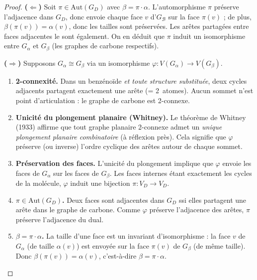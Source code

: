 \documentclass[12pt,a4paper]{article}
\theoremstyle{definition}
\theoremstyle{remark}
\newcommand{\B}{\mathcal{B}}
\newcommand{\GD}{G_{\!D}}
\newcommand{\GB}{G_{\!\B}}
\newcommand{\VD}{V_{\!D}}
\newcommand{\Aut}{\mathrm{Aut}}
\begin{document}
\begin{proof}
\textbf{(}$\Leftarrow$\textbf{)} Soit $\pi \in \Aut(\GD)$ avec
$\beta = \pi \cdot \alpha$. L'automorphisme $\pi$ pr\'eserve l'adjacence
dans $\GD$, donc envoie chaque face $v$ d'$\GB$ sur la face $\pi(v)$ ;
de plus, $\beta(\pi(v)) = \alpha(v)$, donc les tailles sont pr\'eserv\'ees.
Les ar\^etes partag\'ees entre faces adjacentes le sont \'egalement.
On en d\'eduit que $\pi$ induit un isomorphisme entre $G_\alpha$ et
$G_\beta$ (les graphes de carbone respectifs).

\textbf{(}$\Rightarrow$\textbf{)} Supposons $G_\alpha \cong G_\beta$
via un isomorphisme $\varphi : V(G_\alpha) \to V(G_\beta)$.

\begin{enumerate}[label=(\arabic*),leftmargin=*]
  \item \textbf{2-connexit\'e.}
        Dans un benz\'eno\"ide \emph{et toute structure substitu\'ee},
        deux cycles adjacents partagent exactement une ar\^ete
        (= 2~atomes). Aucun sommet n'est point d'articulation : le
        graphe de carbone est 2-connexe.
  \item \textbf{Unicit\'e du plongement planaire (Whitney).}
        Le th\'eor\`eme de Whitney (1933) affirme que tout graphe
        planaire 2-connexe admet un \emph{unique plongement planaire
        combinatoire} (\`a r\'eflexion pr\`es). Cela signifie que
        $\varphi$ pr\'eserve (ou inverse) l'ordre cyclique des ar\^etes
        autour de chaque sommet.
  \item \textbf{Pr\'eservation des faces.}
        L'unicit\'e du plongement implique que $\varphi$ envoie les
        faces de $G_\alpha$ sur les faces de $G_\beta$. Les faces
        internes \'etant exactement les cycles de la mol\'ecule, $\varphi$
        induit une bijection $\pi : \VD \to \VD$.
  \item \textbf{$\pi \in \Aut(\GD)$.}
        Deux faces sont adjacentes dans $\GD$ ssi elles partagent une
        ar\^ete dans le graphe de carbone. Comme $\varphi$ pr\'eserve
        l'adjacence des ar\^etes, $\pi$ pr\'eserve l'adjacence du dual.
  \item \textbf{$\beta = \pi \cdot \alpha$.}
        La taille d'une face est un invariant d'isomorphisme : la face
        $v$ de $G_\alpha$ (de taille $\alpha(v)$) est envoy\'ee sur la face
        $\pi(v)$ de $G_\beta$ (de m\^eme taille). Donc
        $\beta(\pi(v)) = \alpha(v)$, c'est-\`a-dire $\beta = \pi \cdot
        \alpha$.
        \qedhere
\end{enumerate}
\end{proof}
\end{document}
